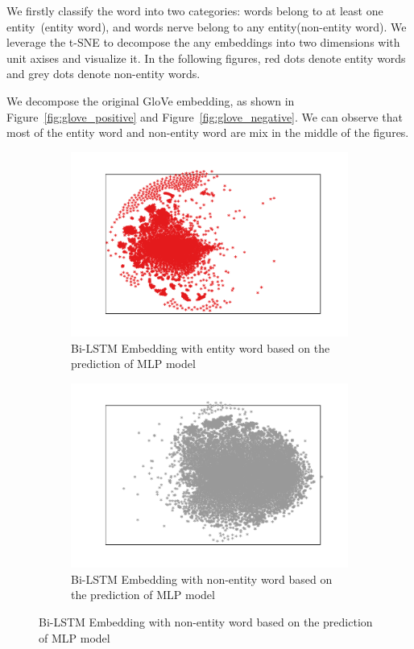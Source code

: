 \documentclass{article}
\begin{document}
\begin{itemize}
We firstly classify the word into two categories: words belong to at least one entity~(entity word), and words nerve belong to any entity(non-entity word). We leverage the t-SNE to decompose the any embeddings into two dimensions with unit axises and visualize it. In the following figures, red dots denote entity words and grey dots denote non-entity words. 

We decompose the original GloVe embedding, as shown in Figure~\ref{fig:glove_positive} and Figure~\ref{fig:glove_negative}. We can observe that most of the entity word and non-entity word are mix in the middle of the figures. 

\begin{figure}[t]
	\centering
	\begin{subfigure}{0.5\textwidth}
		\includegraphics[width=\linewidth]{bi_lstm_mlp_positive.pdf}
		\caption{Bi-LSTM Embedding with entity word based on the prediction of MLP model}
		\label{fig:bi_lstm_mlp_positive}
	\end{subfigure}\hfil 
	\begin{subfigure}{0.5\textwidth}
		\includegraphics[width=\linewidth]{bi_lstm_mlp_negative.pdf}
		\caption{Bi-LSTM Embedding with non-entity word based on the prediction of MLP model}
		\label{fig:bi_lstm_mlp_negative}
	\end{subfigure}
\end{figure}


\end{itemize}
\end{document}
